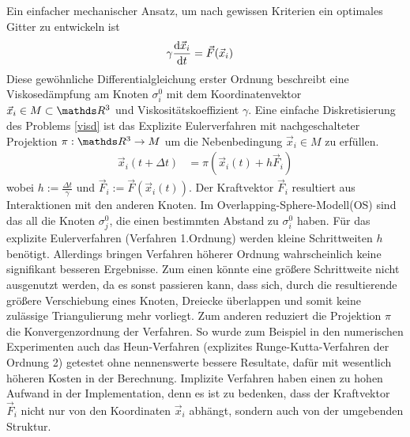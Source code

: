     Ein einfacher mechanischer Ansatz, um nach gewissen Kriterien ein optimales Gitter zu entwickeln ist
    \begin{align}
      \gamma\frac{\mathrm{d} \vec{x}_{i}}{\mathrm{d} t} &= \vec{F}(\vec{x}_{i})
      \label{visd}
    \end{align}
    Diese gewöhnliche Differentialgleichung erster Ordnung beschreibt eine Viskosedämpfung am Knoten 
    \( \sigma^{0}_{i} \) mit dem Koordinatenvektor \( \vec{x}_{i} \in M \subset \R^{3}\) und Viskositätskoeffizient \( \gamma \).
    Eine einfache Diskretisierung des Problems \eqref{visd} ist das Explizite Eulerverfahren 
    mit nachgeschalteter Projektion \( \pi:\R^{3} \rightarrow M \) um die Nebenbedingung \( \vec{x}_{i} \in M \)
    zu erfüllen.
    \begin{align}
      \vec{x}_{i}(t+\Delta t) &= \pi\left(\vec{x}_{i}(t) + h \vec{F}_{i}\right)
      \label{euler}
    \end{align}
    wobei \( h:= \frac{\Delta t}{\gamma} \) und \( \vec{F}_{i}:= \vec{F}(\vec{x}_{i}(t)) \).
    Der Kraftvektor \( \vec{F}_{i} \) resultiert aus Interaktionen mit den anderen Knoten. 
    Im Overlapping-Sphere-Modell(OS)\cite{meshCooper} sind das all die Knoten \( \sigma^{0}_{j} \), die einen bestimmten Abstand zu \( \sigma^{0}_{i} \) haben.
    Für das explizite Eulerverfahren (Verfahren 1.Ordnung) werden kleine Schrittweiten \( h \) benötigt. 
    Allerdings bringen Verfahren höherer Ordnung wahrscheinlich keine signifikant besseren Ergebnisse. Zum einen könnte eine größere Schrittweite
    nicht ausgenutzt werden, da es sonst passieren kann, dass sich, durch die resultierende größere Verschiebung eines Knoten, Dreiecke überlappen
    und somit keine zulässige Triangulierung mehr vorliegt. Zum anderen reduziert die Projektion \( \pi \) die Konvergenzordnung der Verfahren.
    So wurde zum Beispiel in den numerischen Experimenten auch das Heun-Verfahren (explizites Runge-Kutta-Verfahren der Ordnung 2) getestet ohne
    nennenswerte bessere Resultate, dafür mit wesentlich höheren Kosten in der Berechnung.
    Implizite Verfahren haben einen zu hohen Aufwand in der Implementation, denn es ist zu bedenken, dass der Kraftvektor \(\vec{F}_{i}\) nicht
    nur von den Koordinaten \(  \vec{x}_{i} \) abhängt, sondern auch von der umgebenden Struktur.

